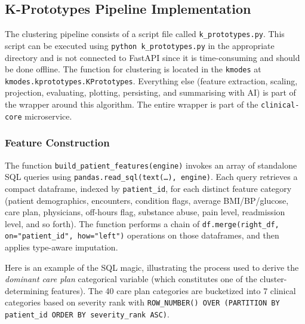\subsection{K-Prototypes Pipeline Implementation}

The clustering pipeline consists of a script file called \texttt{k\_prototypes.py}. This script can be executed using \texttt{python k\_prototypes.py} in the appropriate directory and is not connected to FastAPI since it is time-consuming and should be done offline. The function for clustering is located in the \texttt{kmodes} at \texttt{kmodes.kprototypes.KPrototypes}. Everything else (feature extraction, scaling, projection, evaluating, plotting, persisting, and summarising with AI) is part of the wrapper around this algorithm. The entire wrapper is part of the \texttt{clinical-core} microservice.

\subsubsection*{Feature Construction}

The function \texttt{build\_patient\_features(engine)} invokes an array of standalone SQL queries using \texttt{pandas.read\_sql(text(\dots), engine)}. Each query retrieves a compact dataframe, indexed by \texttt{patient\_id}, for each distinct feature category (patient demographics, encounters, condition flags, average BMI/BP/glucose, care plan, physicians, off-hours flag, substance abuse, pain level, readmission level, and so forth). The function performs a chain of \texttt{df.merge(right\_df, on="patient\_id", how="left")} operations on those dataframes, and then applies type-aware imputation.

Here is an example of the SQL magic, illustrating the process used to derive the \emph{dominant care plan} categorical variable (which constitutes one of the cluster-determining features). The 40 care plan categories are bucketized into 7 clinical categories based on severity rank with \texttt{ROW\_NUMBER() OVER (PARTITION BY patient\_id ORDER BY severity\_rank ASC)}.


